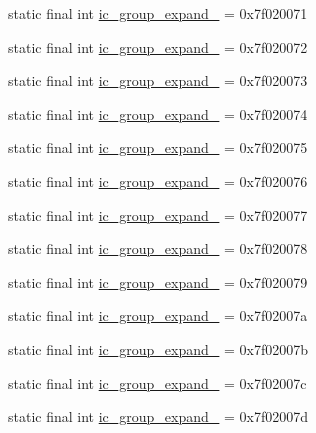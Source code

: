 \begin{CompactItemize}
\item 
static final int \hyperlink{classandroid_1_1support_1_1v7_1_1palette_1_1_r_1_1drawable_ed14a9f9a940a66aeec8f38001a32bd4}{ic\_\-group\_\-expand\_} = 0x7f020071
\item 
static final int \hyperlink{classandroid_1_1support_1_1v7_1_1palette_1_1_r_1_1drawable_92046994351aba74b79d37d6c926c0cd}{ic\_\-group\_\-expand\_} = 0x7f020072
\item 
static final int \hyperlink{classandroid_1_1support_1_1v7_1_1palette_1_1_r_1_1drawable_d00920c7c67491503f2f533205eb66d6}{ic\_\-group\_\-expand\_} = 0x7f020073
\item 
static final int \hyperlink{classandroid_1_1support_1_1v7_1_1palette_1_1_r_1_1drawable_3dd538f17b5b09e7b9f2f554dfc0651b}{ic\_\-group\_\-expand\_} = 0x7f020074
\item 
static final int \hyperlink{classandroid_1_1support_1_1v7_1_1palette_1_1_r_1_1drawable_7c97c63df7ffe18d3187d14f00b19879}{ic\_\-group\_\-expand\_} = 0x7f020075
\item 
static final int \hyperlink{classandroid_1_1support_1_1v7_1_1palette_1_1_r_1_1drawable_5fdad3f6b70e75ab7f20b2b9bf302fd2}{ic\_\-group\_\-expand\_} = 0x7f020076
\item 
static final int \hyperlink{classandroid_1_1support_1_1v7_1_1palette_1_1_r_1_1drawable_742808d5d5060d52457926d954e54483}{ic\_\-group\_\-expand\_} = 0x7f020077
\item 
static final int \hyperlink{classandroid_1_1support_1_1v7_1_1palette_1_1_r_1_1drawable_a9d2652ed58baf6104435e381334e6b4}{ic\_\-group\_\-expand\_} = 0x7f020078
\item 
static final int \hyperlink{classandroid_1_1support_1_1v7_1_1palette_1_1_r_1_1drawable_64d0045adf1f158575ec8986b81a6561}{ic\_\-group\_\-expand\_} = 0x7f020079
\item 
static final int \hyperlink{classandroid_1_1support_1_1v7_1_1palette_1_1_r_1_1drawable_679a858901ec183d85cd9e3f23974a29}{ic\_\-group\_\-expand\_} = 0x7f02007a
\item 
static final int \hyperlink{classandroid_1_1support_1_1v7_1_1palette_1_1_r_1_1drawable_9bf61240ad022601b7878014486f3ca2}{ic\_\-group\_\-expand\_} = 0x7f02007b
\item 
static final int \hyperlink{classandroid_1_1support_1_1v7_1_1palette_1_1_r_1_1drawable_70984ad7564a2c073086eb41678e2284}{ic\_\-group\_\-expand\_} = 0x7f02007c
\item 
static final int \hyperlink{classandroid_1_1support_1_1v7_1_1palette_1_1_r_1_1drawable_160165763e66a0782be2bc2aa9610ef2}{ic\_\-group\_\-expand\_} = 0x7f02007d

\end{CompactItemize}
